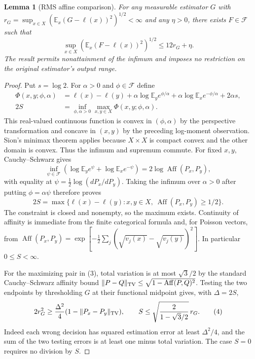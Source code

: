 \documentclass[11pt]{article}
\newtheorem{lemma}[theorem]{Lemma}
\newcommand{\E}{\mathbb E}
\newcommand{\Aff}{\operatorname{Aff}}
\begin{document}
\begin{lemma}[RMS affine comparison]\label{lem:comparison}
For any measurable estimator $G$ with
$r_G=\sup_{x\in X}(\E_x(G-\ell(x))^2)^{1/2}<\infty$ and any $\eta>0$,
there exists $F\in\mathcal F$ such that
\[
 \sup_{x\in X}(\E_x(F-\ell(x))^2)^{1/2}\le12r_G+\eta.       \tag{2}
\]
The result permits nonattainment of the infimum and imposes no restriction
on the original estimator's output range.
\end{lemma}
\begin{proof}
Put $s=\log2$. For $\alpha>0$ and $\phi\in\mathcal F$ define
\begin{align*}
 \Phi(x,y;\phi,\alpha)
 &=\ell(x)-\ell(y)
   +\alpha\log\E_y e^{\phi/\alpha}
   +\alpha\log\E_x e^{-\phi/\alpha}+2\alpha s,\\
 2S&=\inf_{\phi,\alpha>0}\max_{x,y\in X}\Phi(x,y;\phi,\alpha).
\end{align*}
This real-valued continuous function is convex in $(\phi,\alpha)$ by the
perspective transformation and concave in $(x,y)$ by the preceding
log-moment observation. Sion's minimax theorem applies because $X\times X$
is compact convex and the other domain is convex. Thus the infimum and
supremum commute. For fixed $x,y$, Cauchy--Schwarz gives
\[
 \inf_{\psi\in\mathcal F}
  \left(\log\E_y e^\psi+\log\E_x e^{-\psi}\right)
   =2\log\Aff(P_x,P_y),
\]
with equality at $\psi=\tfrac12\log(dP_x/dP_y)$.
Taking the infimum over $\alpha>0$ after putting $\phi=\alpha\psi$
therefore proves
\[
 2S=\max\{\ell(x)-\ell(y):x,y\in X,\ \Aff(P_x,P_y)\ge1/2\}. \tag{3}
\]
The constraint is closed and nonempty, so the maximum exists. Continuity
of affinity is immediate from the finite categorical formula and, for
Poisson vectors, from
$\Aff(P_x,P_y)=\exp[-\tfrac12\sum_j(\sqrt{v_j(x)}-\sqrt{v_j(y)})^2]$.
In particular $0\le S<\infty$.

For the maximizing pair in (3), total variation is at most $\sqrt3/2$
by the standard Cauchy--Schwarz affinity bound
$\|P-Q\|_{\rm TV}\le\sqrt{1-\Aff(P,Q)^2}$.
Testing the two endpoints by thresholding $G$ at their functional midpoint
gives, with $\Delta=2S$,
\[
 2r_G^2\ge \frac{\Delta^2}{4}
           (1-\|P_x-P_y\|_{\rm TV}),\qquad
 S\le\sqrt{\frac{2}{1-\sqrt3/2}}\,r_G.                    \tag{4}
\]
Indeed each wrong decision has squared estimation error at least
$\Delta^2/4$, and the sum of the two testing errors is at least one minus
total variation. The case $S=0$ requires no division by $S$.


\end{proof}
\end{document}
